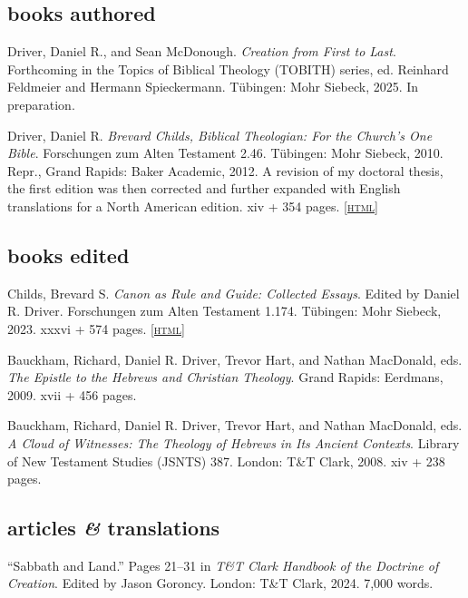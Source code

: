\documentclass[11pt]{article}
\newcommand{\amper}{\emph{\&}}
\newcommand{\html}[1]{\href{#1}{\footnotesize\textsc{[html]}}}
\newcommand{\years}[1]{\marginnote{\footnotesize #1}}
\begin{document}
\subsection*{books authored}

\years{2025}
Driver, Daniel R., and Sean McDonough. \emph{Creation from First to Last}. Forthcoming in the Topics of Biblical Theology (TOBITH) series, ed. Reinhard Feldmeier and Hermann Spieckermann. Tübingen: Mohr Siebeck, 2025. In preparation.

\years{2010, 2012}
Driver, Daniel R. \emph{Brevard Childs, Biblical Theologian: For the Church’s One Bible}. Forschungen zum Alten Testament 2.46. Tübingen: Mohr Siebeck, 2010. Repr., Grand Rapids: Baker Academic, 2012. A revision of my doctoral thesis, the first edition was then corrected and further expanded with English translations for a North American edition. xiv + 354 pages. %
\html{http://danieldriver.com/bsc/}

\subsection*{books edited}

\years{2023}
Childs, Brevard S. \emph{Canon as Rule and Guide: Collected Essays}. Edited by Daniel R. Driver. Forschungen zum Alten Testament 1.174. Tübingen: Mohr Siebeck, 2023. xxxvi + 574 pages.
\html{http://danieldriver.com/bsc/}

\years{2009}
Bauckham, Richard, Daniel R. Driver, Trevor Hart, and Nathan MacDonald, eds. \emph{The Epistle to the Hebrews and Christian Theology}. Grand Rapids: Eerdmans, 2009. xvii + 456 pages. %

\years{2008}
Bauckham, Richard, Daniel R. Driver, Trevor Hart, and Nathan MacDonald, eds. \emph{A Cloud of Witnesses: The Theology of Hebrews in Its Ancient Contexts}. Library of New Testament Studies (JSNTS) 387. London: T\&T Clark, 2008. xiv + 238 pages. %

\subsection*{articles \amper{} translations}

\years{2024}
``Sabbath and Land.'' Pages 21--31 in \emph{T\&T Clark Handbook of the
Doctrine of Creation}. Edited by Jason Goroncy. London: T\&T Clark, 2024. 7,000 words.
\end{document}
